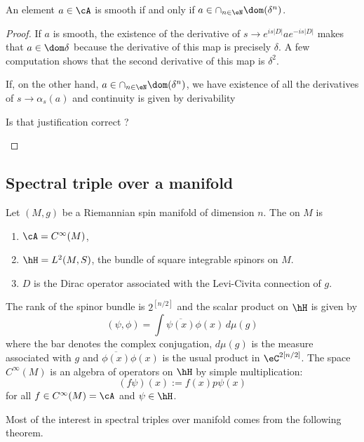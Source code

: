\begin{proposition}
An element $a\in\cA$ is smooth if and only if $a\in\cap_{n\in\eN}\dom(\delta^n)$.
\end{proposition}

\begin{proof}
If $a$ is smooth, the existence of the derivative of $s\to  e^{is| D |}a e^{-is| D |}$ makes that $a\in\dom\delta$ because the derivative of this map is precisely $\delta$. A few computation shows that the second derivative of this map is $\delta^2$.

If, on the other hand, $a\in\cap_{n\in\eN}\dom(\delta^n)$, we have existence of all the derivatives of $s\to\alpha_s(a)$ and continuity is given by derivability
\begin{probleme}
	Is that justification correct ?
\end{probleme}

\end{proof}

\subsection{Spectral triple over a manifold}

Let $(M,g)$ be a Riemannian spin manifold of dimension $n$. The  on $M$ is 
\begin{enumerate}
\item $\cA= C^{\infty}(M)$,
\item $\hH=L^2(M,S)$, the bundle of square integrable spinors on $M$.
\item $D$ is the Dirac operator associated with the Levi-Civita connection of $g$.
\end{enumerate}
The rank of the spinor bundle is $2^{[n/2]}$ and the scalar product on $\hH$ is given by
\[ 
  (\psi,\phi)=\int \overline{ \psi(x) }\phi(x)\,d\mu(g)
\]
where the bar denotes the complex conjugation, $d\mu(g)$ is the measure associated with $g$ and $\overline{ \phi(x) }\phi(x)$ is the usual product in $\eC^{2[n/2]}$. The space $ C^{\infty}(M)$ is an algebra of operators on $\hH$ by simple multiplication:
\begin{equation}
(f\psi)(x):=f(x)p\psi(x)
\end{equation}
for all $f\in C^{\infty}(M)=\cA$ and $\psi\in\hH$.

Most of the interest in spectral triples over manifold comes from the following theorem.

